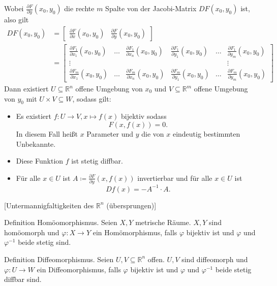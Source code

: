 \documentclass[fleqn,draft,a5paper]{article}
\theoremstyle{remark}
\begin{document}
Wobei \(\frac{\partial F}{\partial y}(x_{0}, y_{0}) \) die rechte \(m\) Spalte von der
Jacobi-Matrix \(DF(x_{0},y_{0})\) ist, also gilt
\begin{align*}
  DF(x_{0}, y_{0}) &=
  \begin{bmatrix}
    \frac{\partial F}{\partial x}(x_{0}, y_{0}) & \frac{\partial F}{\partial y}(x_{0}, y_{0})
  \end{bmatrix} \\ &=
  \begin{bmatrix}
    \frac{\partial F_{1}}{\partial x_{1}}(x_{0}, y_{0})
    & \ldots
    & \frac{\partial F_{1}}{\partial x_{n}}(x_{0}, y_{0})
    & \frac{\partial F_{1}}{\partial y_{1}}(x_{0}, y_{0})
    & \ldots
    & \frac{\partial F_{1}}{\partial y_{m}}(x_{0}, y_{0}) \\
    \vdots & & & & & \vdots \\
    \frac{\partial F_{m}}{\partial x_{1}}(x_{0}, y_{0})
    & \ldots
    & \frac{\partial F_{m}}{\partial x_{n}}(x_{0}, y_{0})
    & \frac{\partial F_{m}}{\partial y_{1}}(x_{0}, y_{0})
    & \ldots
    & \frac{\partial F_{m}}{\partial y_{m}}(x_{0}, y_{0})
  \end{bmatrix}  
\end{align*}
Dann existiert \(U \subseteq \mathbb{R}^{n}\) offene Umgebung von \(x_{0}\) und \(V \subseteq \mathbb{R}^{m}\)
offene Umgebung von \(y_{0}\) mit \(U \times V \subseteq W\), sodass gilt:
\begin{itemize}
\item Es existiert \(f: U \to V, x \mapsto f(x)\) bijektiv sodass
  \[F(x, f(x)) = 0.\]
  In diesem Fall heißt \(x\) Parameter und \(y\) die von \(x\) eindeutig
  bestimmten Unbekannte.

\item Diese Funktion \(f\) ist stetig diffbar.
\item Für alle \(x \in U\) ist \(A \coloneq \frac{\partial F}{\partial y}(x, f(x))\) invertierbar und
  für alle \(x \in U\) ist
  \[Df(x) = - A^{-1} \cdot A.\]
\end{itemize}

[Untermannigfaltigkeiten des \(\mathbb{R}^{n}\) (übersprungen)]

Definition Homöomorphismus.  Seien \(X, Y\) metrische Räume.  \(X, Y\)
sind homöomorph und \(\varphi\colon X \to Y\) ein Homömorphismus, falls \(\varphi\) bijektiv
ist und \(\varphi\) und \(\varphi^{-1}\) beide stetig sind.

Definition Diffeomorphismus.  Seien \(U, V \subseteq \mathbb{R}^{n}\) offen.  \(U, V\)
sind diffeomorph und \(\varphi\colon U \to W\) ein Diffeomorphismus, falls \(\varphi\) bijektiv
ist und \(\varphi\) und \(\varphi^{-1}\) beide stetig diffbar sind.
\end{document}
